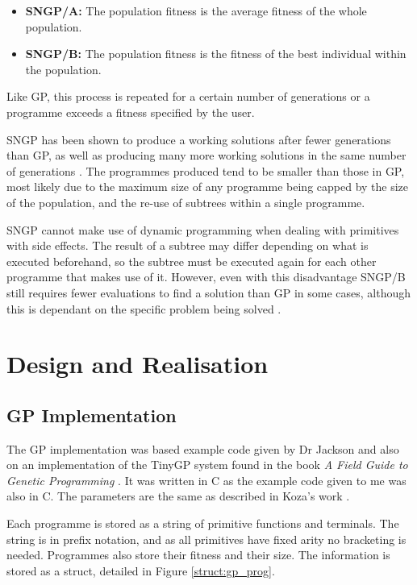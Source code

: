\documentclass{article}
\begin{document}
	\begin{itemize}
		\item \textbf{SNGP/A:} The population fitness is the average fitness of the whole population.
		
		\item \textbf{SNGP/B:} The population fitness is the fitness of the best individual within the population.
	\end{itemize} 
	
	Like GP, this process is repeated for a certain number of generations or a programme exceeds a fitness specified by the user.
	
	SNGP has been shown to produce a working solutions after fewer generations than GP, as well as producing many more working solutions in the same number of generations \cite{jackson_new_2012}. The programmes produced tend to be smaller than those in GP, most likely due to the maximum size of any programme being capped by the size of the population, and the re-use of subtrees within a single programme.
	
	SNGP cannot make use of dynamic programming when dealing with primitives with side effects. The result of a subtree may differ depending on what is executed beforehand, so the subtree must be executed again for each other programme that makes use of it. However, even with this disadvantage SNGP/B still requires fewer evaluations to find a solution than GP in some cases, although this is dependant on the specific problem being solved \cite{jackson_single_2012}.
	
	\section{Design and Realisation}
	
	\subsection{GP Implementation}
	
	The GP implementation was based example code given by Dr Jackson and also on an implementation of the TinyGP system found in the book \textit{A Field Guide to Genetic
		Programming} \cite{poli_field_2008}. It was written in C as the example code given to me was also in C. The parameters are the same as described in Koza's work \cite{kinnear_generality_1993}.
	
	Each programme is stored as a string of primitive functions and terminals. The string is in prefix notation, and as all primitives have fixed arity no bracketing is needed. Programmes also store their fitness and their size. The information is stored as a struct, detailed in Figure \ref{struct:gp_prog}.
	
\end{document}
